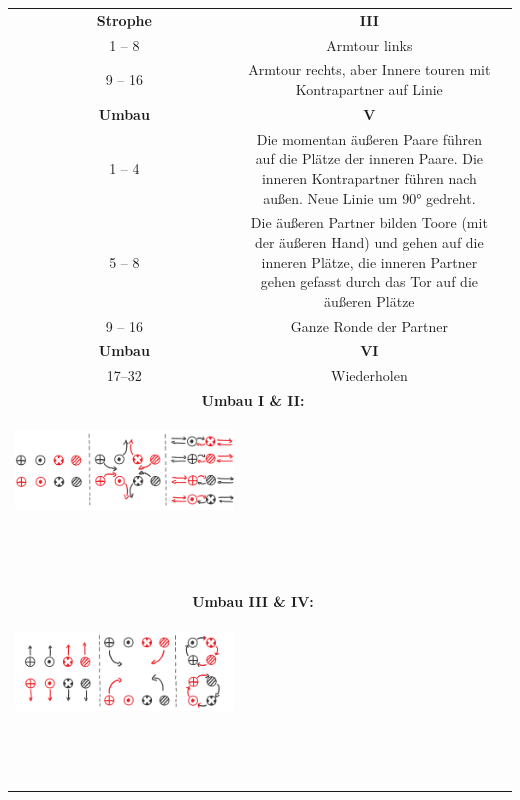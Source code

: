 \documentclass[
	12pt,
	]{scrartcl}
\newcommand{\danceinstructionsel}{~ & ~ \\}
\begin{document}
\begin{longtable}{c | c | c}
\textbf{Strophe} & \textbf{III} \\
1 -- 8 & Armtour links \\
9 -- 16 & Armtour rechts, aber Innere touren mit Kontrapartner auf Linie \\
\textbf{Umbau} & \textbf{V} \\
1 -- 4 & Die momentan äußeren Paare führen auf die Plätze der inneren Paare. Die inneren Kontrapartner führen nach außen. Neue Linie um 90° gedreht. \\
5 -- 8 & Die äußeren Partner bilden Toore (mit der äußeren Hand) und gehen auf die inneren Plätze, die inneren Partner gehen gefasst durch das Tor auf die äußeren Plätze \\
9 -- 16 & Ganze Ronde der Partner \\
\textbf{Umbau} & \textbf{VI} \\
17--32 & Wiederholen\\


\multicolumn{2}{c}{\textbf{\large Umbau I \& II:}}\\
\begin{center}
	\includegraphics[width=.93\textwidth]{img/lmbt-1}
\end{center}
\danceinstructionsel
\danceinstructionsel
\multicolumn{2}{c}{\textbf{\large Umbau III \& IV:}}\\
\begin{center}
	\includegraphics[width=.93\textwidth]{img/lmbt-2}
\end{center}
\danceinstructionsel
\danceinstructionsel


\end{longtable}
\end{document}
